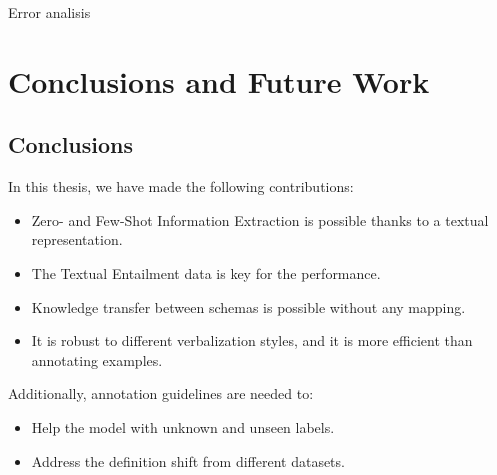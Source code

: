 \documentclass[
    11pt,
    notheorems,
    xcolor={dvipsnames},
    hyperref={
        pdfstartview=FitH, 
        pdftitle={Ikasketa-adibide urriko Informazio-Erauzketa}, 
        pdfauthor={Oscar Sainz Jimenez}, 
        citecolor=secondary, 
    }
]{beamer}
\begin{document}
\begin{frame}[t]
\begin{block}{Error analisis}
        \begin{itemize}
        \end{itemize}

    \end{block}

\end{frame}

\section{Conclusions and Future Work}
\makesubsectiontitlepage

\subsection{Conclusions}

\begin{frame}
     {
        In this thesis, we have made the following contributions:
        \begin{itemize}
            \item Zero- and Few-Shot Information Extraction is possible thanks to a textual representation.
            \item The Textual Entailment data is key for the performance.
            \item Knowledge transfer between schemas is possible without any mapping.
            \item It is robust to different verbalization styles, and it is more efficient than annotating examples.
        \end{itemize}
        \blockskip
    }

     {
        Additionally, annotation guidelines are needed to:
        \begin{itemize}
            \item Help the model with unknown and unseen labels.
            \item Address the definition shift from different datasets.
        \end{itemize}
    }

\end{frame}
\end{document}
